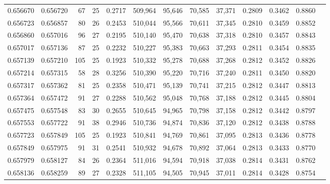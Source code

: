 \begin{tabular}{rrrrrrrrrrrrr}
0.656670 & 0.656720 &    67 &  25 &                                     0.2717 & 509,964 &  95,646 &  70,585 &  37,371 & 0.2809 & 0.3462 & 0.8860 \\
0.656723 & 0.656857 &    80 &  26 &                                     0.2453 & 510,044 &  95,566 &  70,611 &  37,345 & 0.2810 & 0.3459 & 0.8852 \\
0.656860 & 0.657016 &    96 &  27 &                                     0.2195 & 510,140 &  95,470 &  70,638 &  37,318 & 0.2810 & 0.3457 & 0.8843 \\
0.657017 & 0.657136 &    87 &  25 &                                     0.2232 & 510,227 &  95,383 &  70,663 &  37,293 & 0.2811 & 0.3454 & 0.8835 \\
0.657139 & 0.657210 &   105 &  25 &                                     0.1923 & 510,332 &  95,278 &  70,688 &  37,268 & 0.2812 & 0.3452 & 0.8826 \\
0.657214 & 0.657315 &    58 &  28 &                                     0.3256 & 510,390 &  95,220 &  70,716 &  37,240 & 0.2811 & 0.3450 & 0.8820 \\
0.657317 & 0.657362 &    81 &  25 &                                     0.2358 & 510,471 &  95,139 &  70,741 &  37,215 & 0.2812 & 0.3447 & 0.8813 \\
0.657364 & 0.657472 &    91 &  27 &                                     0.2288 & 510,562 &  95,048 &  70,768 &  37,188 & 0.2812 & 0.3445 & 0.8804 \\
0.657475 & 0.657548 &    83 &  30 &                                     0.2655 & 510,645 &  94,965 &  70,798 &  37,158 & 0.2812 & 0.3442 & 0.8797 \\
0.657553 & 0.657722 &    91 &  38 &                                     0.2946 & 510,736 &  94,874 &  70,836 &  37,120 & 0.2812 & 0.3438 & 0.8788 \\
0.657723 & 0.657849 &   105 &  25 &                                     0.1923 & 510,841 &  94,769 &  70,861 &  37,095 & 0.2813 & 0.3436 & 0.8778 \\
0.657849 & 0.657975 &    91 &  31 &                                     0.2541 & 510,932 &  94,678 &  70,892 &  37,064 & 0.2813 & 0.3433 & 0.8770 \\
0.657979 & 0.658127 &    84 &  26 &                                     0.2364 & 511,016 &  94,594 &  70,918 &  37,038 & 0.2814 & 0.3431 & 0.8762 \\
0.658136 & 0.658259 &    89 &  27 &                                     0.2328 & 511,105 &  94,505 &  70,945 &  37,011 & 0.2814 & 0.3428 & 0.8754 \\

\end{tabular}

